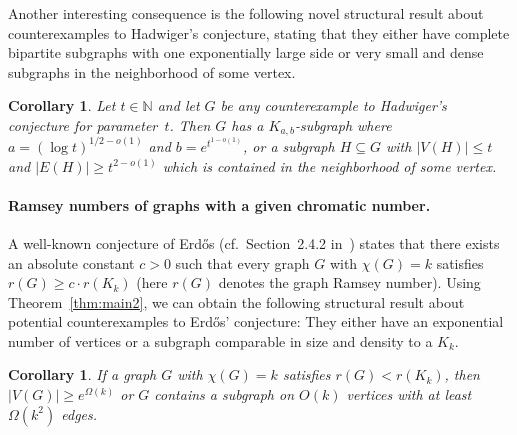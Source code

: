 \documentclass[10pt]{amsart}
\newtheorem{corollary}[theorem]{Corollary}
\theoremstyle{definition}
\begin{document}
    Another interesting consequence is the following novel structural result about counterexamples to Hadwiger's conjecture, stating that they either have complete bipartite subgraphs with one exponentially large side or very small and dense subgraphs in the neighborhood of some vertex.
\begin{corollary}\label{cor:had2}
Let $t\in \mathbb{N}$ and let $G$ be any counterexample to Hadwiger's conjecture for parameter~$t$. Then $G$ has a $K_{a,b}$-subgraph where $a=(\log t)^{1/2-o(1)}$ and $b=e^{t^{1-o(1)}}$, or a subgraph $H\subseteq G$ with $|V(H)|\le t$ and $|E(H)|\ge t^{2-o(1)}$ which is contained in the neighborhood of some vertex.
    \end{corollary}

\paragraph*{\textbf{Ramsey numbers of graphs with a given chromatic number.}} A well-known conjecture of Erd\H{o}s (cf.~Section~2.4.2 in~\cite{chunggraham}) states that there exists an absolute constant $c>0$ such that every graph $G$ with $\chi(G)=k$ satisfies $r(G)\ge c\cdot r(K_k)$ (here $r(G)$ denotes the graph Ramsey number). Using Theorem~\ref{thm:main2}, we can obtain the following structural result about potential counterexamples to Erd\H{o}s' conjecture: They either have an exponential number of vertices or a subgraph comparable in size and density to a $K_k$.
    \begin{corollary}\label{cor:erd}
    If a graph $G$ with $\chi(G)=k$ satisfies $r(G)<r(K_k)$, then $|V(G)|\ge e^{\Omega(k)}$ or $G$ contains a subgraph on $O(k)$ vertices with at least $\Omega(k^2)$ edges.
    \end{corollary}
\end{document}
